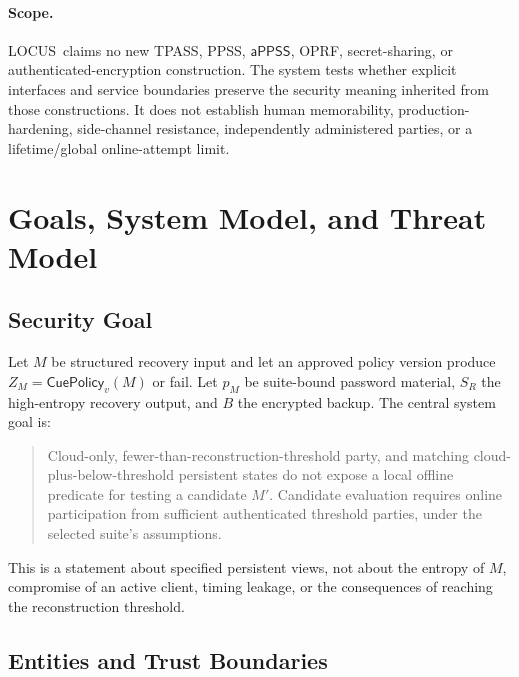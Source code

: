 \documentclass[sigconf,anonymous]{acmart}
\newcommand{\LOCUS}{\textsf{LOCUS}}
\newcommand{\APPSS}{\ensuremath{\mathsf{aPPSS}}}
\newcommand{\CuePolicy}{\ensuremath{\mathsf{CuePolicy}}}
\begin{document}
\paragraph{Scope.}
\LOCUS\ claims no new TPASS, PPSS, \APPSS, OPRF, secret-sharing, or
authenticated-encryption construction. The system tests whether explicit
interfaces and service boundaries preserve the security meaning inherited
from those constructions. It does not establish human memorability,
production-hardening, side-channel resistance, independently administered
parties, or a lifetime/global online-attempt limit.

\section{Goals, System Model, and Threat Model}
\label{sec:model}

\subsection{Security Goal}

Let \(M\) be structured recovery input and let an approved policy version
produce \(Z_M=\CuePolicy_v(M)\) or fail. Let \(p_M\) be suite-bound password
material, \(S_R\) the high-entropy recovery output, and \(B\) the encrypted
backup. The central system goal is:

\begin{quote}
Cloud-only, fewer-than-reconstruction-threshold party, and matching
cloud-plus-below-threshold persistent states do not expose a local offline
predicate for testing a candidate \(M'\). Candidate evaluation requires
online participation from sufficient authenticated threshold parties, under
the selected suite's assumptions.
\end{quote}

This is a statement about specified persistent views, not about the entropy of
\(M\), compromise of an active client, timing leakage, or the consequences of
reaching the reconstruction threshold.

\subsection{Entities and Trust Boundaries}
\end{document}
